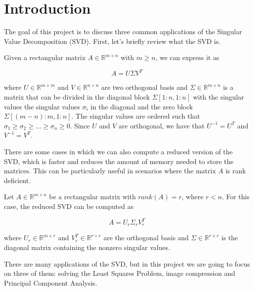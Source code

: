 \documentclass[11pt,a4paper]{article}
\begin{document}
\tableofcontents
\thispagestyle{empty}				%

\newpage

\setlength{\parskip}{1em}
\setlength{\parindent}{0pt}

\section{Introduction}

The goal of this project is to discuss three common applications of the Singular Value
Decomposition (SVD). First, let's briefly review what the SVD is.

Given a rectangular matrix $A \in \mathbb{R}^{m \times n}$ with $m \geq n$, we can express
it as

\[
  A = U \Sigma V^T
\]

where $U \in \mathbb{R}^{m \times m}$ and $V \in \mathbb{R}^{n \times n}$ are two orthogonal basis
and $\Sigma \in \mathbb{R}^{m \times n}$ is a matrix that can be divided in the diagonal block
$\Sigma\left[1:n, 1:n\right]$ with the singular values the singular values $\sigma_i$ in the diagonal
and the zero block $\Sigma\left[(m-n):m, 1:n\right]$. The singular values are ordered such that
$\sigma_1 \geq \sigma_2 \geq \dots \geq \sigma_n \geq 0$. Since $U$ and $V$ are orthogonal, we have
that $U^{-1} = U^T$ and $V^{-1} = V^T$.

There are some cases in which we can also compute a reduced version of the SVD, which is faster and
reduces the amount of memory needed to store the matrices. This can be particularly useful in scenarios
where the matrix $A$ is rank deficient.

Let $A \in \mathbb{R}^{m \times n}$ be a rectangular matrix with $rank(A) = r$, where $r < n$. For this
case, the reduced SVD can be computed as

\begin{equation}
  \label{eq:reduced-svd}
  A = U_r \Sigma_r V_r^T
\end{equation}


where $U_r \in \mathbb{R}^{m \times r}$ and $V_r^T \in \mathbb{R}^{r \times r}$ are the orthogonal
basis and $\Sigma \in \mathbb{R}^{r \times r}$ is the diagonal matrix containing the nonzero
singular values.

There are many applications of the SVD, but in this project we are going to focus on three of them:
solving the Least Squares Problem, image compression and Principal Component Analysis.
\end{document}
